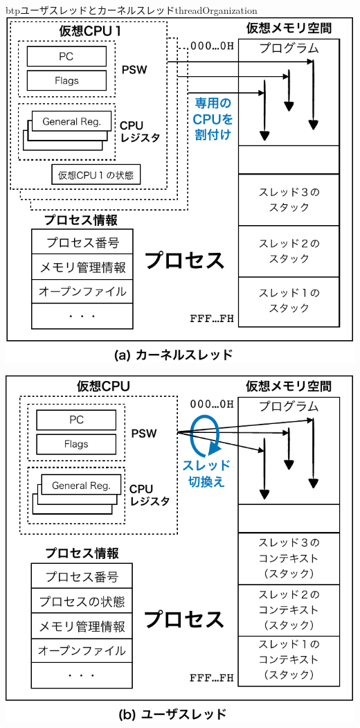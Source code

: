 \begin{myfig}{btp}{ユーザスレッドとカーネルスレッド}{threadOrganization}
\includegraphics[scale=0.6]{Fig/kernelThread-crop.pdf}

\vspace{0.8cm}

\includegraphics[scale=0.6]{Fig/userThread-crop.pdf}
\end{myfig}


